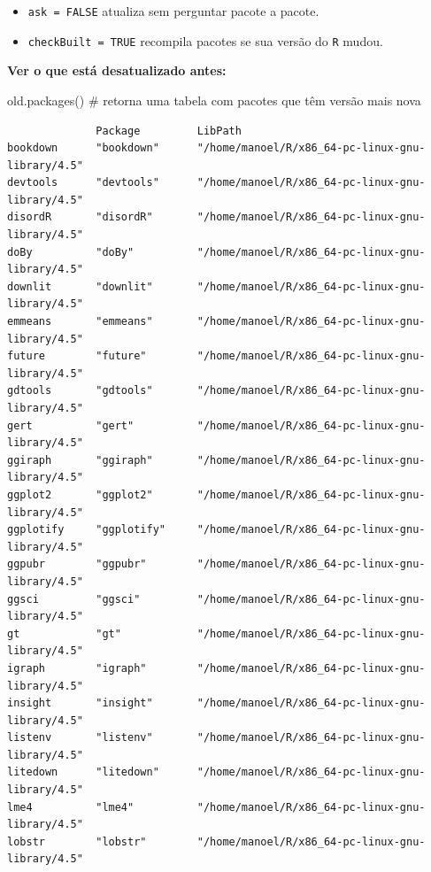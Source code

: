 \documentclass[
  letterpaper,
  DIV=11,
  numbers=noendperiod]{scrreprt}
\newenvironment{Shaded}{\begin{snugshade}}{\end{snugshade}}
\newcommand{\CommentTok}[1]{\textcolor[rgb]{0.37,0.37,0.37}{#1}}
\newcommand{\FunctionTok}[1]{\textcolor[rgb]{0.28,0.35,0.67}{#1}}
\newcommand{\NormalTok}[1]{\textcolor[rgb]{0.00,0.23,0.31}{#1}}
\begin{document}
\begin{itemize}
\item
  \texttt{ask\ =\ FALSE} atualiza sem perguntar pacote a pacote.
\item
  \texttt{checkBuilt\ =\ TRUE} recompila pacotes se sua versão do
  \texttt{R} mudou.
\end{itemize}

\textbf{Ver o que está desatualizado antes:}

\begin{Shaded}
\begin{Highlighting}[]
\FunctionTok{old.packages}\NormalTok{()  }\CommentTok{\# retorna uma tabela com pacotes que têm versão mais nova}
\end{Highlighting}
\end{Shaded}

\begin{verbatim}
              Package         LibPath                                         
bookdown      "bookdown"      "/home/manoel/R/x86_64-pc-linux-gnu-library/4.5"
devtools      "devtools"      "/home/manoel/R/x86_64-pc-linux-gnu-library/4.5"
disordR       "disordR"       "/home/manoel/R/x86_64-pc-linux-gnu-library/4.5"
doBy          "doBy"          "/home/manoel/R/x86_64-pc-linux-gnu-library/4.5"
downlit       "downlit"       "/home/manoel/R/x86_64-pc-linux-gnu-library/4.5"
emmeans       "emmeans"       "/home/manoel/R/x86_64-pc-linux-gnu-library/4.5"
future        "future"        "/home/manoel/R/x86_64-pc-linux-gnu-library/4.5"
gdtools       "gdtools"       "/home/manoel/R/x86_64-pc-linux-gnu-library/4.5"
gert          "gert"          "/home/manoel/R/x86_64-pc-linux-gnu-library/4.5"
ggiraph       "ggiraph"       "/home/manoel/R/x86_64-pc-linux-gnu-library/4.5"
ggplot2       "ggplot2"       "/home/manoel/R/x86_64-pc-linux-gnu-library/4.5"
ggplotify     "ggplotify"     "/home/manoel/R/x86_64-pc-linux-gnu-library/4.5"
ggpubr        "ggpubr"        "/home/manoel/R/x86_64-pc-linux-gnu-library/4.5"
ggsci         "ggsci"         "/home/manoel/R/x86_64-pc-linux-gnu-library/4.5"
gt            "gt"            "/home/manoel/R/x86_64-pc-linux-gnu-library/4.5"
igraph        "igraph"        "/home/manoel/R/x86_64-pc-linux-gnu-library/4.5"
insight       "insight"       "/home/manoel/R/x86_64-pc-linux-gnu-library/4.5"
listenv       "listenv"       "/home/manoel/R/x86_64-pc-linux-gnu-library/4.5"
litedown      "litedown"      "/home/manoel/R/x86_64-pc-linux-gnu-library/4.5"
lme4          "lme4"          "/home/manoel/R/x86_64-pc-linux-gnu-library/4.5"
lobstr        "lobstr"        "/home/manoel/R/x86_64-pc-linux-gnu-library/4.5"

\end{verbatim}
\end{document}
